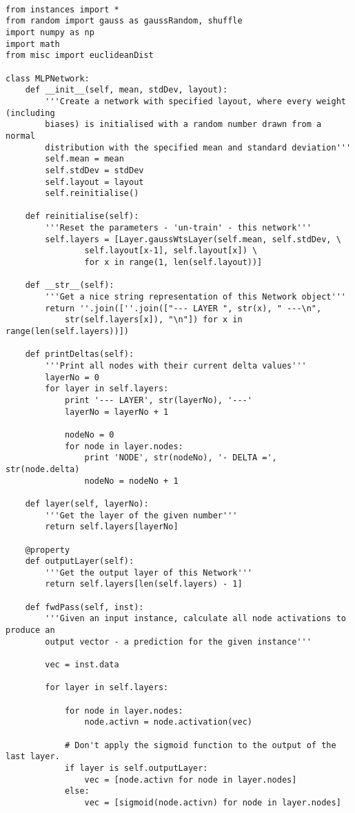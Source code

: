 \documentclass{article}
\begin{document}
\begin{verbatim}

from instances import *
from random import gauss as gaussRandom, shuffle
import numpy as np
import math
from misc import euclideanDist

class MLPNetwork:
    def __init__(self, mean, stdDev, layout):
        '''Create a network with specified layout, where every weight (including
        biases) is initialised with a random number drawn from a normal
        distribution with the specified mean and standard deviation'''
        self.mean = mean
        self.stdDev = stdDev
        self.layout = layout
        self.reinitialise()

    def reinitialise(self):
        '''Reset the parameters - 'un-train' - this network'''
        self.layers = [Layer.gaussWtsLayer(self.mean, self.stdDev, \
                self.layout[x-1], self.layout[x]) \
                for x in range(1, len(self.layout))]

    def __str__(self):
        '''Get a nice string representation of this Network object'''
        return ''.join([''.join(["--- LAYER ", str(x), " ---\n",
            str(self.layers[x]), "\n"]) for x in range(len(self.layers))])

    def printDeltas(self):
        '''Print all nodes with their current delta values'''
        layerNo = 0
        for layer in self.layers:
            print '--- LAYER', str(layerNo), '---'
            layerNo = layerNo + 1

            nodeNo = 0
            for node in layer.nodes:
                print 'NODE', str(nodeNo), '- DELTA =', str(node.delta)
                nodeNo = nodeNo + 1

    def layer(self, layerNo):
        '''Get the layer of the given number'''
        return self.layers[layerNo]

    @property
    def outputLayer(self):
        '''Get the output layer of this Network'''
        return self.layers[len(self.layers) - 1]

    def fwdPass(self, inst):
        '''Given an input instance, calculate all node activations to produce an
        output vector - a prediction for the given instance'''

        vec = inst.data

        for layer in self.layers:

            for node in layer.nodes:
                node.activn = node.activation(vec)

            # Don't apply the sigmoid function to the output of the last layer.
            if layer is self.outputLayer:
                vec = [node.activn for node in layer.nodes]
            else:
                vec = [sigmoid(node.activn) for node in layer.nodes]


\end{verbatim}
\end{document}
